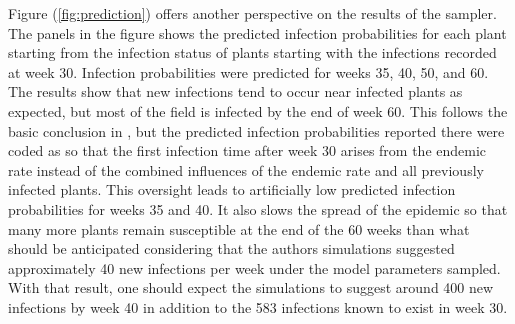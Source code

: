 \documentclass{uwstat572}
\begin{document}
Figure (\ref{fig:prediction}) offers another perspective on the results of the sampler. 
The panels in the figure shows the predicted infection probabilities for each plant starting from the infection status of plants starting with the infections recorded at week 30. 
Infection probabilities were predicted for weeks 35, 40, 50, and 60. 
The results show that new infections tend to occur near infected plants as expected, but most of the field is infected by the end of week 60. 
This follows the basic conclusion in \citet{Brown}, but the predicted infection probabilities reported there were coded as so that the first infection time after week 30 arises from the endemic rate instead of the combined influences of the endemic rate and all previously infected plants.
This oversight leads to artificially low predicted infection probabilities for weeks 35 and 40. 
It also slows the spread of the epidemic so that many more plants remain susceptible at the end of the 60 weeks than what should be anticipated considering that the authors simulations suggested approximately 40 new infections per week under the model parameters sampled. 
With that result, one should expect the simulations to suggest around 400 new infections by week 40 in addition to the 583 infections known to exist in week 30. 
\end{document}
